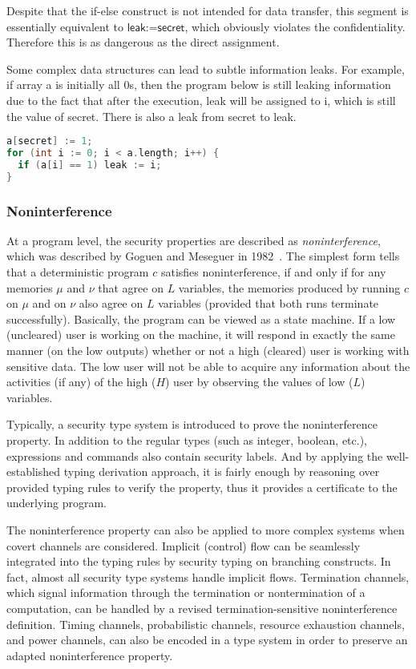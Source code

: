 Despite that the \textsf{if-else} construct is not intended for data transfer, this segment is essentially equivalent to $\textsf{leak:=secret}$, which obviously violates the confidentiality. Therefore this is as dangerous as the direct assignment.

Some complex data structures can lead to subtle information leaks. For example, if array \textsf{a} is initially all \textsf{0}s, then the program below is still leaking information due to the fact that after the execution, \textsf{leak} will be assigned to \textsf{i}, which is still the value of \textsf{secret}. There is also a leak from \textsf{secret} to \textsf{leak}.

\begin{lstlisting}[language=c,float=h]
a[secret] := 1;
for (int i := 0; i < a.length; i++) {
  if (a[i] == 1) leak := i;
}
\end{lstlisting}

\subsubsection{Noninterference}
At a program level, the security properties are described as \emph{noninterference}, which was described by Goguen and Meseguer in 1982~\cite{Goguen:1982ta}. The simplest form tells that a deterministic program $c$ satisfies noninterference, if and only if for any memories $\mu$ and $\nu$ that agree on $L$ variables, the memories produced by running $c$ on $\mu$ and on $\nu$ also agree on $L$ variables (provided that both runs terminate successfully). Basically, the program can be viewed as a state machine. If a low (uncleared) user is working on the machine, it will respond in exactly the same manner (on the low outputs) whether or not a high (cleared) user is working with sensitive data. The low user will not be able to acquire any information about the activities (if any) of the high ($H$) user by observing the values of low ($L$) variables.

Typically, a security type system is introduced to prove the noninterference property. In addition to the regular types (such as integer, boolean, etc.), expressions and commands also contain security labels. And by applying the well-established typing derivation approach, it is fairly enough by reasoning over provided typing rules to verify the property, thus it provides a certificate to the underlying program.

The noninterference property can also be applied to more complex systems when covert channels are considered. Implicit (control) flow can be seamlessly integrated into the typing rules by security typing on branching constructs. In fact, almost all security type systems handle implicit flows. Termination channels, which signal information through the termination or nontermination of a computation, can be handled by a revised termination-sensitive noninterference definition. Timing channels, probabilistic channels, resource exhaustion channels, and power channels, can also be encoded in a type system in order to preserve an adapted noninterference property.

